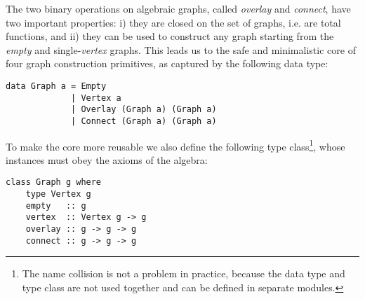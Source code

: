The two binary operations on algebraic graphs, called \emph{overlay} and \emph{connect},
have two important properties: i) they are closed on the set of graphs, i.e. are total
functions, and ii) they can be used to construct any graph starting from the \emph{empty} and
single-\emph{vertex} graphs. This leads us to the safe and minimalistic core of four graph
construction primitives, as captured by the following data type:

\begin{verbatim}
data Graph a = Empty
             | Vertex a
             | Overlay (Graph a) (Graph a)
             | Connect (Graph a) (Graph a)
\end{verbatim}

\noindent
To make the core more reusable we also define the following type class\footnote{The
name collision is not a problem in practice, because the data type and type class
are not used together and can be defined in separate modules.}, whose
instances must obey the axioms of the algebra:

\begin{verbatim}
class Graph g where
    type Vertex g
    empty   :: g
    vertex  :: Vertex g -> g
    overlay :: g -> g -> g
    connect :: g -> g -> g
\end{verbatim}

